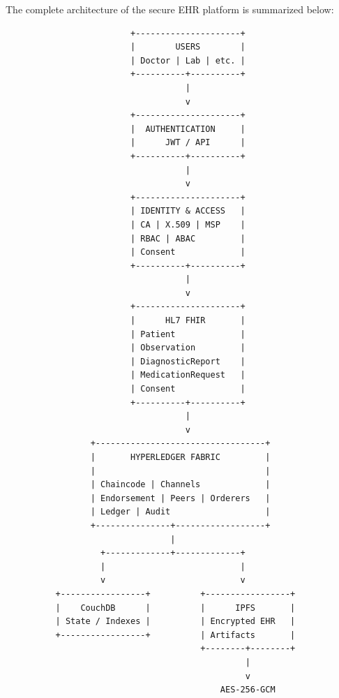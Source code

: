 \documentclass[11pt,a4paper]{article}
\begin{document}
The complete architecture of the secure EHR platform is summarized below:

\begin{lstlisting}
                         +---------------------+
                         |        USERS        |
                         | Doctor | Lab | etc. |
                         +----------+----------+
                                    |
                                    v
                         +---------------------+
                         |  AUTHENTICATION     |
                         |      JWT / API      |
                         +----------+----------+
                                    |
                                    v
                         +---------------------+
                         | IDENTITY & ACCESS   |
                         | CA | X.509 | MSP    |
                         | RBAC | ABAC         |
                         | Consent             |
                         +----------+----------+
                                    |
                                    v
                         +---------------------+
                         |      HL7 FHIR       |
                         | Patient             |
                         | Observation         |
                         | DiagnosticReport    |
                         | MedicationRequest   |
                         | Consent             |
                         +----------+----------+
                                    |
                                    v
                 +----------------------------------+
                 |       HYPERLEDGER FABRIC         |
                 |                                  |
                 | Chaincode | Channels             |
                 | Endorsement | Peers | Orderers   |
                 | Ledger | Audit                   |
                 +---------------+------------------+
                                 |
                   +-------------+-------------+
                   |                           |
                   v                           v
          +-----------------+          +-----------------+
          |    CouchDB      |          |      IPFS       |
          | State / Indexes |          | Encrypted EHR   |
          +-----------------+          | Artifacts       |
                                       +--------+--------+
                                                |
                                                v
                                           AES-256-GCM


\end{lstlisting}
\end{document}
